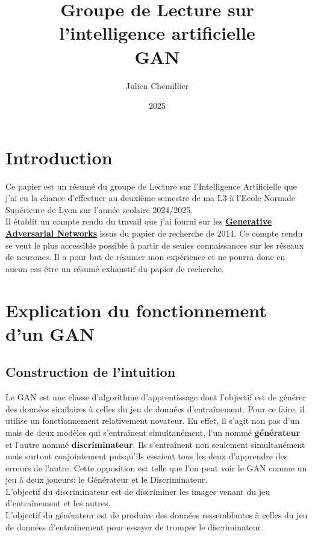 \documentclass{article}
\title{Groupe de Lecture sur l'intelligence artificielle\\GAN}
\author{Julien Chemillier}
\date{2025}
\begin{document}
\maketitle

\section{Introduction}

Ce papier est un résumé du groupe de Lecture sur l'Intelligence Artificielle que j'ai eu la chance d'effectuer
au deuxième semestre de ma L3 à l'Ecole Normale Supérieure de Lyon sur l'année scolaire 2024/2025. \\
Il établit un compte rendu du travail que j'ai fourni sur les \textbf{\href{https://arxiv.org/pdf/1406.2661}{Generative Adversarial Networks}} issus
du papier de recherche de 2014. Ce compte
rendu se veut le plus accessible possible à partir de seules connaissances sur les réseaux de neurones. Il a pour
but de résumer mon expérience et ne pourra donc en aucun cas être un résumé exhaustif du papier de recherche.

\section{Explication du fonctionnement d'un GAN}
\subsection{Construction de l'intuition}
Le GAN est une classe d'algorithme d'apprentissage dont l'objectif est de générer des données similaires à celles
du jeu de données d'entraînement. Pour ce faire, il utilise un fonctionnement relativement novateur. En effet, il
s'agit non pas d'un mais de deux modèles qui s'entraînent simultanément, l'un nommé \textbf{générateur} et l'autre
nommé \textbf{discriminateur}. Ils s'entraînent non seulement simultanément mais surtout conjointement puisqu'ils
essaient tous les deux d'apprendre des erreurs de l'autre. Cette opposition est telle que l'on peut voir le GAN comme
un jeu à deux joueurs: le Générateur et le Discriminateur. \\

L'objectif du discriminateur est de discriminer les images venant du jeu d'entraînement et les autres. \\
L'objectif du générateur est de produire des données ressemblantes à celles du jeu de données d'entraînement pour
essayer de tromper le discriminateur. \\
\end{document}
